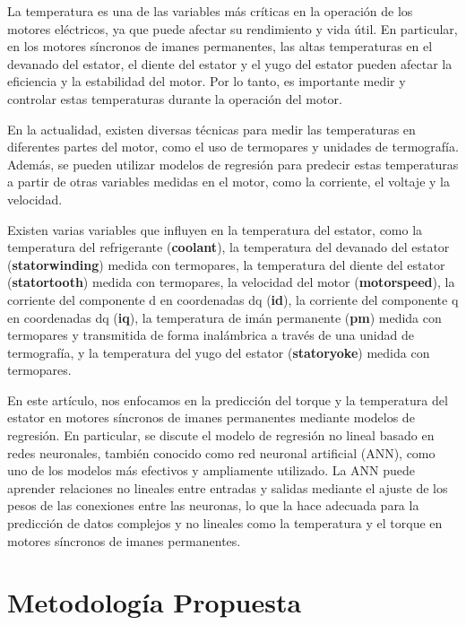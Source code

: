 \documentclass{article}
\begin{document}
La temperatura es una de las variables más críticas en la operación de los motores eléctricos, ya que puede afectar su rendimiento y vida útil. En particular, en los motores síncronos de imanes permanentes, las altas temperaturas en el devanado del estator, el diente del estator y el yugo del estator pueden afectar la eficiencia y la estabilidad del motor. Por lo tanto, es importante medir y controlar estas temperaturas durante la operación del motor.

En la actualidad, existen diversas técnicas para medir las temperaturas en diferentes partes del motor, como el uso de termopares y unidades de termografía. Además, se pueden utilizar modelos de regresión para predecir estas temperaturas a partir de otras variables medidas en el motor, como la corriente, el voltaje y la velocidad.

Existen varias variables que influyen en la temperatura del estator, como la temperatura del refrigerante (\textbf{coolant}), la temperatura del devanado del estator (\textbf{stator\textunderscore winding}) medida con termopares, la temperatura del diente del estator (\textbf{stator\textunderscore tooth}) medida con termopares, la velocidad del motor (\textbf{motor\textunderscore speed}), la corriente del componente d en coordenadas dq (\textbf{i\textunderscore d}), la corriente del componente q en coordenadas dq (\textbf{i\textunderscore q}), la temperatura de imán permanente (\textbf{pm}) medida con termopares y transmitida de forma inalámbrica a través de una unidad de termografía, y la temperatura del yugo del estator (\textbf{stator\textunderscore yoke}) medida con termopares.


En este artículo, nos enfocamos en la predicción del torque y la temperatura del estator en motores síncronos de imanes permanentes mediante modelos de regresión. En particular, se discute el modelo de regresión no lineal basado en redes neuronales, también conocido como red neuronal artificial (ANN), como uno de los modelos más efectivos y ampliamente utilizado. La ANN puede aprender relaciones no lineales entre entradas y salidas mediante el ajuste de los pesos de las conexiones entre las neuronas, lo que la hace adecuada para la predicción de datos complejos y no lineales como la temperatura y el torque en motores síncronos de imanes permanentes.

\section{Metodología Propuesta}
\end{document}
